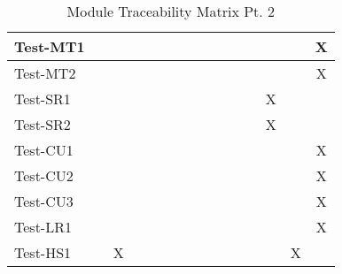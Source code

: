 \documentclass[12pt, titlepage]{article}
\begin{document}
\begin{table}[H]
\begin{adjustwidth}{-0.3in}{-0.5in}
{\begin{tabular}{c|c|c|c|c|c|c|c|c|c|c|c|c|c|c|}
\multicolumn{1}{|l|}{{Test-MT1}}   &             &             &             &             &             &             &             &             &              &              &              &             &  & X                   \\ \hline
\multicolumn{1}{|l|}{{Test-MT2}}   &             &             &             &             &             &             &             &             &              &              &              &             &  &    X                \\ \hline
\multicolumn{1}{|l|}{{Test-SR1}}   &             &             &             &             &             &             &             &             &              &              &              &      X       &  &                    \\ \hline
\multicolumn{1}{|l|}{{Test-SR2}}   &             &             &             &             &             &             &             &             &              &              &              &       X      &  &                    \\ \hline
\multicolumn{1}{|l|}{{Test-CU1}}   &             &             &             &             &             &             &             &             &              &              &              &             &  &    X                \\ \hline
\multicolumn{1}{|l|}{{Test-CU2}}   &             &             &             &             &             &             &             &             &              &              &              &             &  &  X                  \\ \hline
\multicolumn{1}{|l|}{{Test-CU3}}   &             &             &             &             &             &             &             &             &              &              &              &             &  &  X                  \\ \hline
\multicolumn{1}{|l|}{{Test-LR1}}   &             &             &             &             &             &             &             &             &              &              &              &             &  & X                   \\ \hline
\multicolumn{1}{|l|}{{Test-HS1}}   &             &          X   &             &             &             &             &             &             &              &              &              &             & X &                    \\ \hline
\end{tabular}}
\caption{Module Traceability Matrix Pt. 2}
    \label{tab:matrix5}
\end{adjustwidth}
\end{table}
\end{document}

